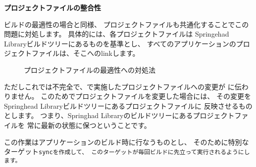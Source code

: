 \medskip
\noindent
\bf{プロジェクトファイルの整合性}
\begin{narrow}[20pt]
	ビルドの最適性の場合と同様、
	プロジェクトファイルも共通化することでこの問題に対処します。
	具体的には、各プロジェクトファイルは
	Springehad Libraryビルドツリーにあるものを基準とし、
	すべてのアプリケーションのプロジェクトファイルは、そこへのlinkします。

	\medskip
	\begin{figure}
    	\begin{narrow}\begin{minipage}{\textwidth}
		\medskip
    	\end{minipage}\end{narrow}
    	\begin{narrow}\begin{minipage}{\textwidth}
		\medskip
  	\end{minipage}\end{narrow}
	\caption{プロジェクトファイルの最適性への対処法}
	\label{fig:SolutionToProjectFile}
	\end{figure}

	\medskip
	ただしこれでは不完全で、で実施したプロジェクトファイルへの変更が
	に伝わりません。
	このためでプロジェクトファイルを変更した場合には、
	その変更をSpringhead Libraryビルドツリーにあるプロジェクトファイルに
	反映させるものとします。
	つまり、Springhad Libraryのビルドツリーにあるプロジェクトファイルを
	常に最新の状態に保つということです。

	この作業はアプリケーションのビルド時に行なうものとし、
	そのために特別なターゲット\tt{sync}を作成して、
	このターゲットが毎回ビルドに先立って実行されるようにします。
\end{narrow}

